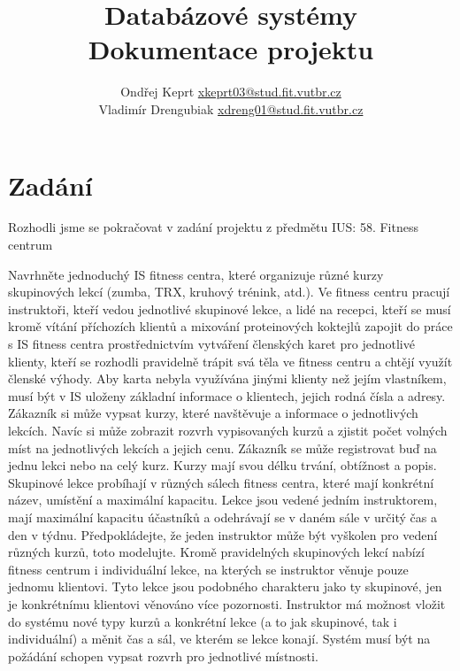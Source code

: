 \documentclass[11pt]{article}
\title{Databázové systémy \\ Dokumentace projektu}
\author{
        Ondřej Keprt \quad \href{mailto:xkeprt03@stud.fit.vutbr.cz}{xkeprt03@stud.fit.vutbr.cz}\\
        Vladimír Drengubiak \quad \href{mailto:xdreng01@stud.fit.vutbr.cz}{xdreng01@stud.fit.vutbr.cz}
    }
\begin{document}
    \maketitle

\section{Zadání}
Rozhodli jsme se pokračovat v zadání projektu z předmětu IUS: 58. Fitness centrum

Navrhněte jednoduchý IS fitness centra, které organizuje různé kurzy skupinových lekcí
(zumba, TRX, kruhový trénink, atd.). Ve fitness centru pracují instruktoři, kteří vedou 
jednotlivé skupinové lekce, a lidé na recepci, kteří se musí kromě vítání příchozích klientů
a mixování proteinových koktejlů zapojit do práce s IS fitness centra prostřednictvím
vytváření členských karet pro jednotlivé klienty, kteří se rozhodli pravidelně trápit svá těla 
ve fitness centru a chtějí využít členské výhody. Aby karta nebyla využívána jinými klienty 
než jejím vlastníkem, musí být v IS uloženy základní informace o klientech, jejich rodná čísla 
a adresy. Zákazník si může vypsat kurzy, které navštěvuje a informace o jednotlivých lekcích. 
Navíc si může zobrazit rozvrh vypisovaných kurzů a zjistit počet volných míst na jednotlivých 
lekcích a jejich cenu. Zákazník se může registrovat buď na jednu lekci nebo na celý kurz. 
Kurzy mají svou délku trvání, obtížnost a popis. Skupinové lekce probíhají v různých sálech 
fitness centra, které mají konkrétní název, umístění a maximální kapacitu. Lekce jsou vedené 
jedním instruktorem, mají maximální kapacitu účastníků a odehrávají se v daném sále v určitý 
čas a den v týdnu. Předpokládejte, že jeden instruktor může být vyškolen pro vedení různých 
kurzů, toto modelujte. Kromě pravidelných skupinových lekcí nabízí fitness centrum i 
individuální lekce, na kterých se instruktor věnuje pouze jednomu klientovi. Tyto lekce jsou 
podobného charakteru jako ty skupinové, jen je konkrétnímu klientovi věnováno více pozornosti. 
Instruktor má možnost vložit do systému nové typy kurzů a konkrétní lekce (a to jak skupinové, 
tak i individuální) a měnit čas a sál, ve kterém se lekce konají. Systém musí být na požádání 
schopen vypsat rozvrh pro jednotlivé místnosti.
\end{document}
